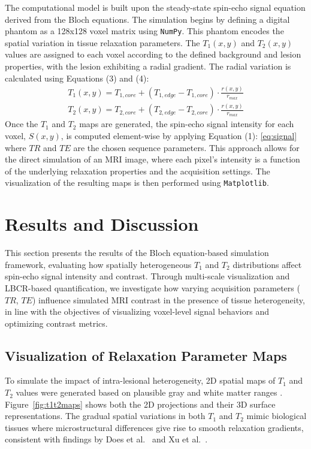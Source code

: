 \documentclass[10pt,a4paper,twoside]{article}
\begin{document}
The computational model is built upon the steady-state spin-echo signal equation derived from the Bloch equations. The simulation begins by defining a digital phantom as a 128x128 voxel matrix using \texttt{NumPy}. This phantom encodes the spatial variation in tissue relaxation parameters. The \(T_1(x,y)\) and \(T_2(x,y)\) values are assigned to each voxel according to the defined background and lesion properties, with the lesion exhibiting a radial gradient. The radial variation is calculated using Equations (3) and (4):
\begin{gather*}
T_{1}(x,y)=T_{1,core}+(T_{1,edge}-T_{1,core})\cdot\frac{r(x,y)}{r_{max}} \tag{(3)}
\end{gather*}
\begin{gather*}
T_{2}(x,y)=T_{2,core}+(T_{2,edge}-T_{2,core})\cdot\frac{r(x,y)}{r_{max}} \tag{(4)}
\end{gather*}
Once the \(T_1\) and \(T_2\) maps are generated, the spin-echo signal intensity for each voxel, \(S(x,y)\), is computed element-wise by applying Equation (1):
\eqref{eq:signal}
where \(TR\) and \(TE\) are the chosen sequence parameters. This approach allows for the direct simulation of an MRI image, where each pixel's intensity is a function of the underlying relaxation properties and the acquisition settings. The visualization of the resulting maps is then performed using \texttt{Matplotlib}.

\section{Results and Discussion}\label{sec:rnd}

This section presents the results of the Bloch equation-based simulation framework, evaluating how spatially heterogeneous \( T_1 \) and \( T_2 \) distributions affect spin-echo signal intensity and contrast. Through multi-scale visualization and LBCR-based quantification, we investigate how varying acquisition parameters (\( TR \), \( TE \)) influence simulated MRI contrast in the presence of tissue heterogeneity, in line with the objectives of visualizing voxel-level signal behaviors and optimizing contrast metrics.

\subsection{Visualization of Relaxation Parameter Maps}

To simulate the impact of intra-lesional heterogeneity, 2D spatial maps of \( T_1 \) and \( T_2 \) values were generated based on plausible gray and white matter ranges \cite{stanisz2005, bojorquez2017}. Figure~\ref{fig:t1t2maps} shows both the 2D projections and their 3D surface representations. The gradual spatial variations in both \( T_1 \) and \( T_2 \) mimic biological tissues where microstructural differences give rise to smooth relaxation gradients, consistent with findings by Does et al.\ \cite{does2002} and Xu et al.\ \cite{xu2009}.
\end{document}
